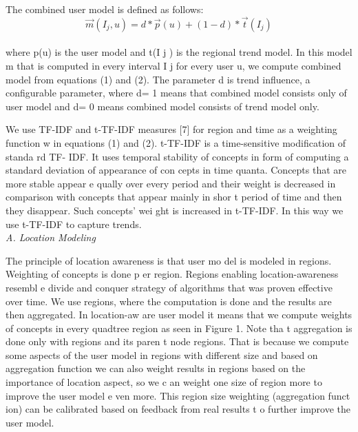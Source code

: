 \documentclass[conference]{IEEEtran}
\begin{document}
The combined user model is defined as follows: 
\\
\begin{equation}
\vec{m}(I_j,u)=d * \vec{p}(u) + (1 - d)*\vec{t}(I_j)
\label{id3}
\end{equation}
\\
where 
p(u)
  is  the  user  model  and 
t(I
j
)
  is  the  regional  trend 
model.  In  this  model 
m
  that  is  computed  in  every  interval 
I
j
for   every   user 
u, 
we   compute   combined   model   from 
equations  (1)  and  (2).  The  parameter 
d
  is  trend  influence,  a 
configurable  parameter,  where 
d=
1
means  that  combined 
model consists only of user model and 
d=
0 means combined 
model consists of trend model only. 

We  use  TF-IDF  and  t-TF-IDF  measures  [7]  for  region 
and time as a weighting function 
w
 in equations (1) and (2). 
t-TF-IDF  is  a  time-sensitive  modification  of  standa
rd  TF-
IDF.   It   uses   temporal   stability   of   concepts   in   form
   of 
computing a standard deviation of appearance of con
cepts in 
time  quanta.  Concepts  that  are  more  stable	  appear  e
qually 
over   every   period   and   their   weight   is   decreased   in 
comparison with concepts that appear mainly in shor
t period 
of  time  and  then  they  disappear.  Such  concepts’  wei
ght  is 
increased  in  t-TF-IDF.  In  this  way  we  use  t-TF-IDF 
to 
capture trends.  \\

\textit{A.   Location Modeling}

The principle of  location  awareness is that  user  mo
del  is 
modeled  in  regions.  Weighting  of  concepts  is  done  p
er 
region. Regions enabling location-awareness resembl
e divide 
and conquer strategy of algorithms that was proven 
effective 
over  time.  We  use  regions,  where  the  computation  is
  done 
and  the  results  are  then  aggregated.  In  location-aw
are  user 
model  it  means  that  we  compute  weights  of  concepts 
in 
every   quadtree   region   as   seen   in   Figure   1.   Note   tha
t 
aggregation  is  done  only  with  regions  and  its  paren
t  node 
regions.  That  is  because  we  compute  some  aspects  of
  the 
user  model  in  regions  with  different  size  and  based
  on 
aggregation  function  we  can  also  weight  results  in 
regions 
based on the importance of location aspect, so we c
an weight 
one  size  of  region  more  to  improve  the  user  model  e
ven 
more.  This  region  size  weighting  (aggregation  funct
ion)  can 
be  calibrated  based  on  feedback  from  real  results  t
o  further 
improve the user model. 
\end{document}
